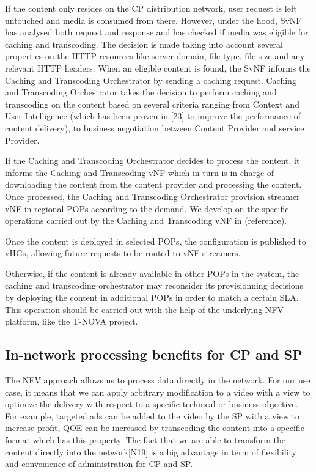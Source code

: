 If the content only resides on the CP distribution network, user request is left untouched and media is consumed from there.
However, under the hood, SvNF has analysed both request and response and has checked if media was eligible for caching and transcoding.
The decision is made taking into account several properties on the HTTP resources like server domain, file type, file size and any relevant HTTP headers.
When an eligible content is found, the SvNF informs the Caching and Transcoding Orchestrator by sending a caching request.
Caching and Transcoding Orchestrator takes the decision to perform caching and transcoding on the content based on several criteria ranging from Context and User Intelligence (which has been proven in [23] to improve the performance of content delivery), to business negotiation between Content Provider and service Provider.

If the Caching and Transcoding Orchestrator decides to process the content, it informs the Caching and Transcoding vNF which in turn is in charge of downloading the content from the content provider and processing the content.
Once processed, the Caching and Transcoding Orchestrator provision streamer vNF in regional POPs according to the demand.
We develop on the specific operations carried out by the Caching and Transcoding vNF in (reference).

Once the content is deployed in selected POPs, the configuration is published to vHGs, allowing future requests to be routed to vNF streamers.

Otherwise, if the content is already available in other POPs in the system, the caching and transcoding orchestrator may reconsider its provisionning decisions by deploying the content in additional POPs in order to match a certain SLA.
This operation should be carried out with the help of the underlying NFV platform, like the T-NOVA project.

\subsection{In-network processing benefits for CP and SP}
The NFV approach allows us to process data directly in the network.
For our use case, it means that we can apply arbitrary modification to a video with a view to optimize the delivery with respect to a specific technical or business objective.
For example, targeted ads can be added to the video by the SP with a view to increase profit, QOE can be increased by transcoding the content into a specific format which has this property.
The fact that we are able to transform the content directly into the network[N19] is a big advantage in term of flexibility and convenience of administration for CP and SP.

